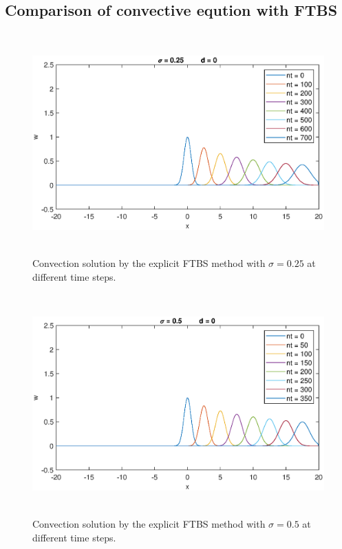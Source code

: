 \documentclass[letterpaper,12pt]{article}
\begin{document}
\subsection{Comparison of convective eqution with FTBS}
\begin{figure}[!ht] 
	\centering 
	\includegraphics[max height=8.5cm]{graphs/FTBS/Convection/sigma025d0.eps}
	\caption{Convection solution by the explicit FTBS method with $\sigma= 0.25$ at different time steps.}
	 \label{fig:FTBSsigma025d0}
\end{figure}
\begin{figure}[!ht] 
	\centering 
	\includegraphics[max height=8.5cm]{graphs/FTBS/Convection/sigma05d0.eps}
	\caption{Convection solution by the explicit FTBS method with $\sigma= 0.5$ at different time steps.}
	 \label{fig:FTBSsigma05d0}
\end{figure}
\newpage
\end{document}
